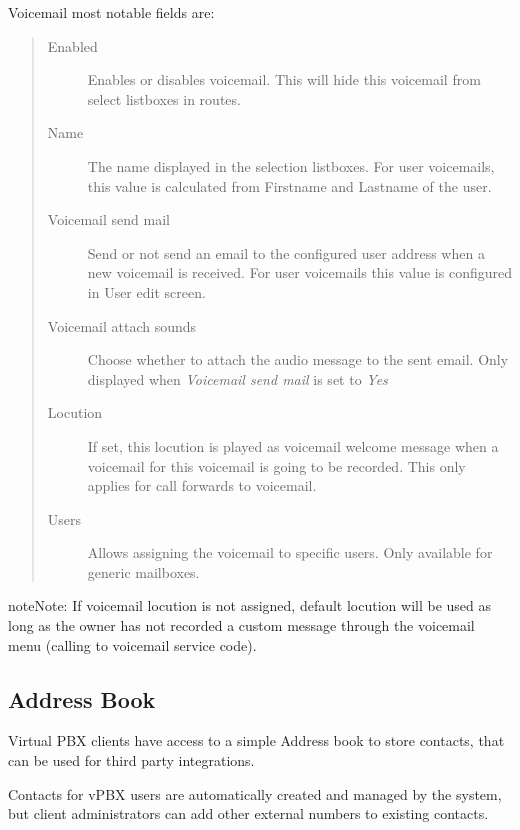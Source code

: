 \documentclass[letterpaper,10pt,english]{sphinxmanual}
\begin{document}
Voicemail most notable fields are:
\begin{quote}
\begin{description}
\item[{Enabled}] \leavevmode
Enables or disables voicemail. This will hide this voicemail from select listboxes in routes.

\item[{Name}] \leavevmode
The name displayed in the selection listboxes. For user voicemails, this value is calculated from Firstname and
Lastname of the user.

\item[{Voicemail send mail}] \leavevmode
Send or not send an email to the configured user address when a new voicemail is received. For user voicemails this value
is configured in User edit screen.

\item[{Voicemail attach sounds}] \leavevmode
Choose whether to attach the audio message to the sent email. Only displayed when \emph{Voicemail send mail} is set to \emph{Yes}

\item[{Locution}] \leavevmode
If set, this locution is played as voicemail welcome message when a voicemail
for this voicemail is going to be recorded. This only applies for call forwards
to voicemail.

\item[{Users}] \leavevmode
Allows assigning the voicemail to specific users. Only available for generic mailboxes.

\end{description}
\end{quote}

\begin{notice}{note}{Note:}
If voicemail locution is not assigned, default locution will be used as long as
the owner has not recorded a custom message through the voicemail menu (calling to
voicemail service code).
\end{notice}


\subsection{Address Book}
\label{administration_portal/client/vpbx/addressbook:address-book}\label{administration_portal/client/vpbx/addressbook::doc}
Virtual PBX clients have access to a simple Address book to store contacts,
that can be used for third party integrations.

Contacts for vPBX users are automatically created and managed by the system,
but client administrators can add other external numbers to existing contacts.
\end{document}
